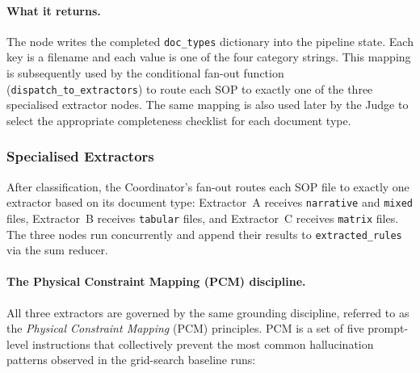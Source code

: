﻿\documentclass[11pt]{article}
\begin{document}
\paragraph{What it returns.}
The node writes the completed \texttt{doc\_types} dictionary into the pipeline
state.  Each key is a filename and each value is one of the four category strings.
This mapping is subsequently used by the conditional fan-out function
(\texttt{dispatch\_to\_extractors}) to route each SOP to exactly one of the three
specialised extractor nodes.  The same mapping is also used later by the Judge to
select the appropriate completeness checklist for each document type.


\subsubsection{Specialised Extractors}
\label{sec:miners}

After classification, the Coordinator's fan-out routes each SOP file to exactly
one extractor based on its document type: Extractor~A receives \texttt{narrative}
and \texttt{mixed} files, Extractor~B receives \texttt{tabular} files, and
Extractor~C receives \texttt{matrix} files.  The three nodes run concurrently and
append their results to \texttt{extracted\_rules} via the sum reducer.

\paragraph{The Physical Constraint Mapping (PCM) discipline.}
All three extractors are governed by the same grounding discipline, referred to as
the \emph{Physical Constraint Mapping} (PCM) principles.  PCM is a set of five
prompt-level instructions that collectively prevent the most common hallucination
patterns observed in the grid-search baseline runs:
\end{document}
